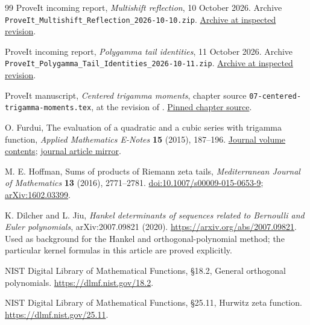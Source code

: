 \documentclass[11pt,letterpaper]{article}
\theoremstyle{definition}
\theoremstyle{remark}
\numberwithin{equation}{section}
\begin{document}
\begin{thebibliography}{99}
ProveIt incoming report,
\emph{Multishift reflection}, 10 October 2026.
Archive \texttt{ProveIt\_Multishift\_Reflection\_2026-10-10.zip}.
\href{https://github.com/VladimirReshetnikov/ProveIt/blob/446dca9bd65c20e409d1d2561d4ffad408103e2a/docs/incoming/ProveIt_Multishift_Reflection_2026-10-10.zip}{Archive at inspected revision}.

ProveIt incoming report,
\emph{Polygamma tail identities}, 11 October 2026.
Archive \texttt{ProveIt\_Polygamma\_Tail\_Identities\_2026-10-11.zip}.
\href{https://github.com/VladimirReshetnikov/ProveIt/blob/446dca9bd65c20e409d1d2561d4ffad408103e2a/docs/incoming/ProveIt_Polygamma_Tail_Identities_2026-10-11.zip}{Archive at inspected revision}.

ProveIt manuscript,
\emph{Centered trigamma moments}, chapter source
\texttt{07-centered-trigamma-moments.tex}, at the revision of \cite{repo}.
\href{https://github.com/VladimirReshetnikov/ProveIt/blob/446dca9bd65c20e409d1d2561d4ffad408103e2a/Analysis/Polylogarithms/docs/manuscript/chapters/07-centered-trigamma-moments.tex}{Pinned chapter source}.

O. Furdui,
The evaluation of a quadratic and a cubic series with trigamma function,
\emph{Applied Mathematics E-Notes} \textbf{15} (2015), 187--196.
\href{https://www.math.nthu.edu.tw/~amen/2015/2015.htm}{Journal volume contents};
\href{https://www.kurims.kyoto-u.ac.jp/EMIS/journals/AMEN/2015/AMEN(150526).pdf}{journal article mirror}.

M. E. Hoffman,
Sums of products of Riemann zeta tails,
\emph{Mediterranean Journal of Mathematics} \textbf{13} (2016),
2771--2781.
\href{https://doi.org/10.1007/s00009-015-0653-9}{doi:10.1007/s00009-015-0653-9};
\href{https://arxiv.org/abs/1602.03399}{arXiv:1602.03399}.

K. Dilcher and L. Jiu,
\emph{Hankel determinants of sequences related to Bernoulli and Euler
polynomials}, arXiv:2007.09821 (2020).
\url{https://arxiv.org/abs/2007.09821}.
Used as background for the Hankel and orthogonal-polynomial method;
the particular kernel formulas in this article are proved explicitly.

NIST Digital Library of Mathematical Functions,
\S18.2, General orthogonal polynomials.
\url{https://dlmf.nist.gov/18.2}.

NIST Digital Library of Mathematical Functions,
\S25.11, Hurwitz zeta function.
\url{https://dlmf.nist.gov/25.11}.


\end{thebibliography}
\end{document}
